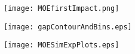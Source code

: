 \begin{figure}[H]
    \centering
    \texttt{[image: MOEfirstImpact.png]}
    \label{fig:cartpole}
\end{figure}

\begin{figure}[H]
    \centering
    \texttt{[image: gapContourAndBins.eps]}
    \label{fig:gapContour}
\end{figure}

\begin{figure}[H]
    \centering
    \texttt{[image: MOESimExpPlots.eps]}
    \label{fig:cartpole_trajectory}
\end{figure}


